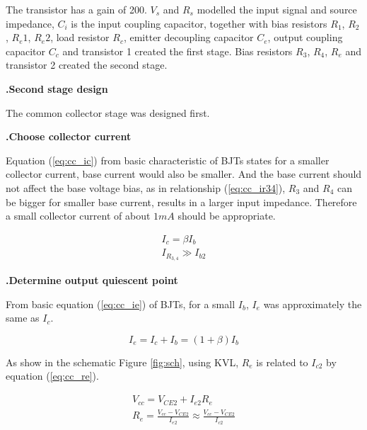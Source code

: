 \documentclass[a4paper,notitlepage,10pt]{report}
\newcommand{\tab}{\hspace{0.75cm}}
\newcommand{\fontHeading}{\fontsize{12pt}{13.2pt}\selectfont}
\newcommand{\fontSubHeading}{\fontsize{10pt}{11pt}\selectfont}
\newcommand{\fontBody}{\fontsize{10pt}{11pt}\selectfont}
\newcounter{sections}
\newcounter{subsections}[sections]
\begin{document}
\begin{multicols}{2}
\parskip=6pt
The transistor has a gain of 200. $V_s$ and $R_s$ modelled the input signal and source impedance, $C_i$ is the input coupling capacitor, together with bias resistors $R_1$, $R_2$, $R_e1$, $R_e2$, load resistor $R_c$, emitter decoupling capacitor $C_e$, output coupling capacitor $C_c$ and transistor 1 created the first stage. Bias resistors $R_3$, $R_4$, $R_e$ and transistor 2 created the second stage.
\parskip=10pt


\fontHeading
{}
\textbf{.\tab Second stage design}

\fontBody
The common collector stage was designed first.

\fontSubHeading
{}
\textbf{.\tab Choose collector current}
\parskip=6pt

\fontBody
Equation (\ref{eq:cc_ic}) from basic characteristic of BJTs states for a smaller collector current, base current would also be smaller. And the base current should not affect the base voltage bias, as in relationship (\ref{eq:cc_ir34}), $R_3$ and $R_4$ can be bigger for smaller base current, results in a larger input impedance. Therefore a small collector current of about $1mA$ should be appropriate.
\parskip=0pt

\begin{gather}
	I_c = \beta I_b
	\label{eq:cc_ic}\\
	I_{R_{3,4}} \gg I_{b2}
	\label{eq:cc_ir34}
\end{gather}
\parskip=6pt

\fontSubHeading
{}
\textbf{.\tab Determine output quiescent point}

\fontBody
From basic equation (\ref{eq:cc_ie}) of BJTs, for a small $I_b$, $I_e$ was approximately the same as $I_c$.
\parskip=0pt

\begin{equation}
	I_e = I_c + I_b = \left( 1 + \beta \right) I_b
	\label{eq:cc_ie}
\end{equation}
\parskip=6pt

As show in the schematic Figure \ref{fig:sch}, using KVL, $R_e$ is related to $I_{c2}$ by equation (\ref{eq:cc_re}).
\parskip=0pt

\begin{gather}
	V_{cc} = V_{CE2} + I_{e2} R_e \nonumber \\
	R_e = \frac{V_{cc} - V_{CE2}}{I_{e2}} \approx \frac{V_{cc} - V_{CE2}}{I_{c2}}
	\label{eq:cc_re}
\end{gather}
\parskip=6pt


\end{multicols}
\end{document}
